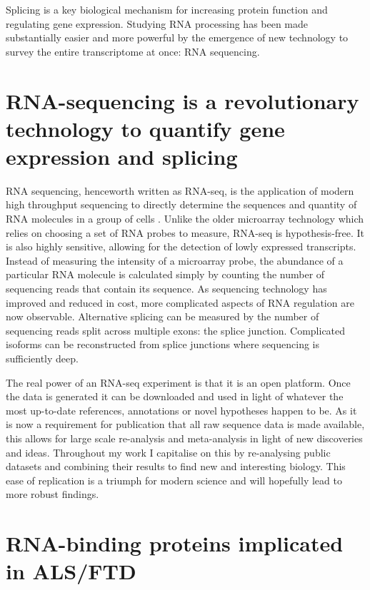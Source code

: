 Splicing is a key biological mechanism for increasing protein function and regulating gene expression.
Studying RNA processing has been made substantially easier and more powerful by the emergence of new technology to survey the entire transcriptome at once: RNA sequencing.



\section{RNA-sequencing is a revolutionary technology to quantify gene expression and splicing} %

RNA sequencing, henceworth written as RNA-seq, is the application of modern high throughput sequencing to directly determine the sequences and quantity of RNA molecules in a group of cells \citep{Wang2009}. 
Unlike the older microarray technology which relies on choosing a set of RNA probes to measure, RNA-seq is hypothesis-free. 
It is also highly sensitive, allowing for the detection of lowly expressed transcripts. 
Instead of measuring the intensity of a microarray probe, the abundance of a particular RNA molecule is calculated simply by counting the number of sequencing reads that contain its sequence. 
As sequencing technology has improved and reduced in cost, more complicated aspects of RNA regulation are now observable. 
Alternative splicing can be measured by the number of sequencing reads split across multiple exons: the splice junction. 
Complicated isoforms can be reconstructed from splice junctions where sequencing is sufficiently deep.

The real power of an RNA-seq experiment is that it is an open platform. 
Once the data is generated it can be downloaded and used in light of whatever the most up-to-date references, annotations or novel hypotheses happen to be. 
As it is now a requirement for publication that all raw sequence data is made available, this allows for large scale re-analysis and meta-analysis in light of new discoveries and ideas. 
Throughout my work I capitalise on this by re-analysing public datasets and combining their results to find new and interesting biology.
This ease of replication is a triumph for modern science and will hopefully lead to more robust findings.


\section{RNA-binding proteins implicated in ALS/FTD}

